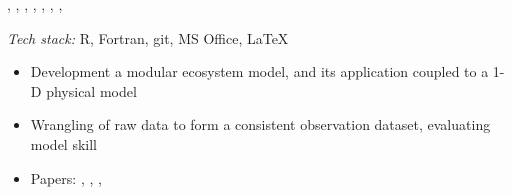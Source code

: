 \documentclass[
	a4paper,
]{fortysecondscv}
\begin{document}
\begin{cvtable}[1.0]
{\begin{changemargin}{-45pt}{0pt}
\begin{itemize}[topsep=0pt,itemsep=0pt,partopsep=0pt, parsep=0pt, leftmargin=*]
            \href{https://doi.org/10.1016/j.ecss.2017.11.002}{\color{pblue}{5}}, %
            \href{https://doi.org/10.1007/s10750-018-3653-5}{\color{pblue}{6}}, %
            \href{https://doi.org/10.1016/j.scitotenv.2018.05.215}{\color{pblue}{7}}, %
            \href{https://doi.org/10.3389/fmars.2019.00370}{\color{pblue}{8}}, %
            \href{https://doi.org/10.1029/2019JC015987}{\color{pblue}{9}}, %
            \href{https://doi.org/10.5194/bg-17-5097-2020}{\color{pblue}{10}}, %
            \href{https://doi.org/10.3389/fmars.2021.596126}{\color{pblue}{11}}, %
            \href{https://doi.org/10.3389/fmars.2021.637483}{\color{pblue}{12}} %
    \end{itemize}
    \end{changemargin}
    }

	{\href{https://www.inrae.fr/en}{\color{pblue}{INRAe, France}}}
	{
	\textit{Tech stack:} R, Fortran, git, MS Office, \LaTeX
	\begin{changemargin}{-45pt}{0pt}
	\begin{itemize}[topsep=0pt,itemsep=0pt,partopsep=0pt, parsep=0pt, leftmargin=*]
     \item Development a modular ecosystem model, and its application coupled to a 1-D physical model
     \item Wrangling of raw data to form a consistent observation dataset, evaluating model skill
     \item Papers:
      \href{https://doi.org/10.1111/fwb.12444}{\color{pblue}{1}}, %
      \href{https://doi.org/10.1007/s10021-014-9837-6}{\color{pblue}{2}}, %
      \href{https://doi.org/10.1016/j.ecolmodel.2017.06.005}{\color{pblue}{3}}, %
      \href{https://doi.org/10.1016/j.envsoft.2017.11.016}{\color{pblue}{4}} %
    \end{itemize}
    \end{changemargin}
    }       


\end{cvtable}
\end{document}
